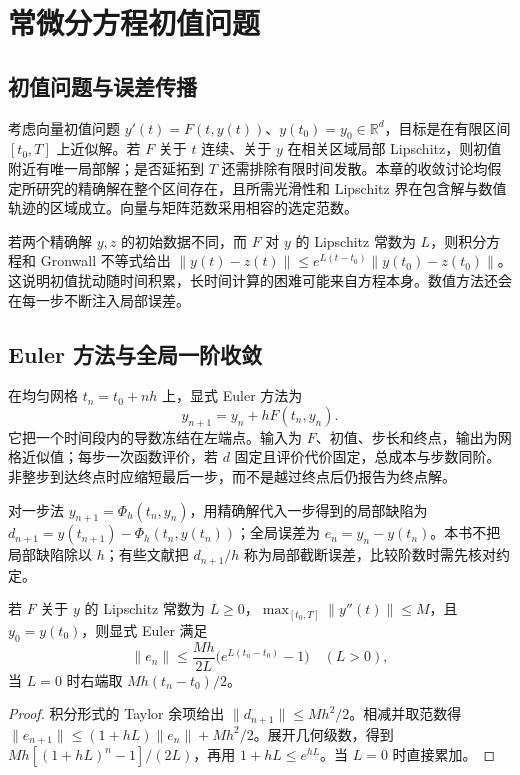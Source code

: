\setcounter{chapter}{9} %
\chapter{常微分方程初值问题}
\label{chap:na-ode}

\section{初值问题与误差传播}
考虑向量初值问题 $y'(t)=F(t,y(t))$、$y(t_0)=y_0\in\mathbb R^d$，目标是在有限区间 $[t_0,T]$ 上近似解。若 $F$ 关于 $t$ 连续、关于 $y$ 在相关区域局部 Lipschitz，则初值附近有唯一局部解；是否延拓到 $T$ 还需排除有限时间发散。本章的收敛讨论均假定所研究的精确解在整个区间存在，且所需光滑性和 Lipschitz 界在包含解与数值轨迹的区域成立。向量与矩阵范数采用相容的选定范数。

若两个精确解 $y,z$ 的初始数据不同，而 $F$ 对 $y$ 的 Lipschitz 常数为 $L$，则积分方程和 Gronwall 不等式给出 $\|y(t)-z(t)\|\le e^{L(t-t_0)}\|y(t_0)-z(t_0)\|$。这说明初值扰动随时间积累，长时间计算的困难可能来自方程本身。数值方法还会在每一步不断注入局部误差。

\section{Euler 方法与全局一阶收敛}
在均匀网格 $t_n=t_0+nh$ 上，显式 Euler 方法为
\begin{equation}
 y_{n+1}=y_n+hF(t_n,y_n).
 \label{eq:na-euler}
\end{equation}
它把一个时间段内的导数冻结在左端点。输入为 $F$、初值、步长和终点，输出为网格近似值；每步一次函数评价，若 $d$ 固定且评价代价固定，总成本与步数同阶。非整步到达终点时应缩短最后一步，而不是越过终点后仍报告为终点解。

\begin{definition}[局部缺陷与全局误差]
对一步法 $y_{n+1}=\Phi_h(t_n,y_n)$，用精确解代入一步得到的局部缺陷为 $d_{n+1}=y(t_{n+1})-\Phi_h(t_n,y(t_n))$；全局误差为 $e_n=y_n-y(t_n)$。本书不把局部缺陷除以 $h$；有些文献把 $d_{n+1}/h$ 称为局部截断误差，比较阶数时需先核对约定。
\end{definition}

\begin{theorem}
若 $F$ 关于 $y$ 的 Lipschitz 常数为 $L\ge0$，$\max_{[t_0,T]}\|y''(t)\|\le M$，且 $y_0=y(t_0)$，则显式 Euler 满足
\[
 \|e_n\|\le\frac{Mh}{2L}\bigl(e^{L(t_n-t_0)}-1\bigr)\quad(L>0),
\]
当 $L=0$ 时右端取 $Mh(t_n-t_0)/2$。
\end{theorem}
\begin{proof}
积分形式的 Taylor 余项给出 $\|d_{n+1}\|\le Mh^2/2$。相减并取范数得 $\|e_{n+1}\|\le(1+hL)\|e_n\|+Mh^2/2$。展开几何级数，得到 $Mh[(1+hL)^n-1]/(2L)$，再用 $1+hL\le e^{hL}$。当 $L=0$ 时直接累加。
\end{proof}

